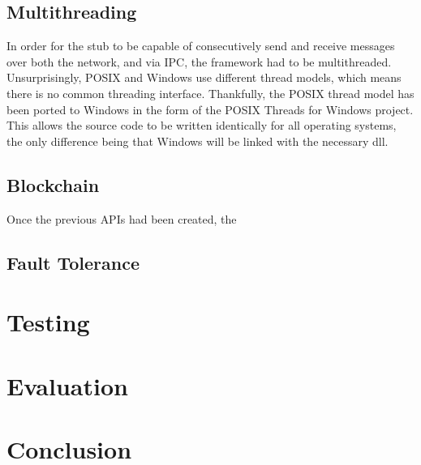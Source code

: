 \documentclass[a4paper, 11pt]{report}
\begin{document}
\section{Multithreading}
In order for the \gls{stub} to be capable of consecutively send and receive messages over both the network, and via \acrshort{IPC}, the framework had to be multithreaded. Unsurprisingly, \acrshort{POSIX} and Windows use different thread models, which means there is no common threading interface. Thankfully, the \acrshort{POSIX} thread model has been ported to Windows in the form of the POSIX Threads for Windows project\cite{pthread}. This allows the source code to be written identically for all operating systems, the only difference being that Windows will be linked with the necessary dll.

\section{Blockchain}
Once the previous \acrshort{API}s had been created, the  

\section{Fault Tolerance}

\chapter{Testing}

\chapter{Evaluation}

\chapter{Conclusion}

\printglossaries

 


\appendix

\iffalse
\end{document}
